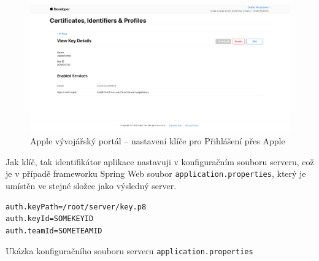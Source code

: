 \begin{figure}[H]
    \centering
    \includegraphics[width=\textwidth]{images/4-implementace/4-1-prihlaseni-pres-apple-klic.pdf}
    \caption{Apple vývojářský portál -- nastavení klíče pro Přihlášení přes Apple}
\end{figure}

Jak klíč, tak identifikátor aplikace nastavuji v konfiguračním souboru serveru, což je v případě frameworku Spring Web soubor \texttt{application.properties}, který je umístěn ve stejné složce jako výsledný server.

\begin{listing}[H]
\begin{verbatim}
auth.keyPath=/root/server/key.p8
auth.keyId=SOMEKEYID
auth.teamId=SOMETEAMID
\end{verbatim}
\caption{Ukázka konfiguračního souboru serveru \texttt{application.properties}}
\end{listing}

